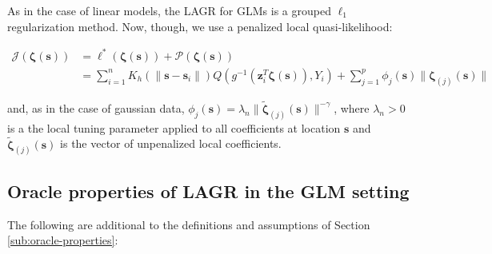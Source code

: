 \documentclass[authoryear,review, 12pt]{elsarticle}
\begin{document}
As in the case of linear models, the LAGR for GLMs is a grouped $\ell_{1}$
regularization method. Now, though, we use a penalized local quasi-likelihood:

\begin{align}
\mathcal{J}\left(\bm{\zeta}(\bm{s})\right) & =\mathcal{\ell}^{*}\left(\bm{\zeta}(\bm{s})\right)+\mathcal{P}\left(\bm{\zeta}(\bm{s})\right)\label{eq:adaptive-lasso-GLLM}\\
 & =\sum_{i=1}^{n}K_{h}\left(\|\bm{s}-\bm{s}_{i}\|\right)Q\left(g^{-1}\left(\bm{z}_{i}^{T}\bm{\zeta}(\bm{s})\right),Y_{i}\right)+\sum_{j=1}^{p}\phi_{j}\left(\bm{s}\right)\|\bm{\zeta}_{\left(j\right)}\left(\bm{s}\right)\|
\end{align}


and, as in the case of gaussian data, $\phi_{j}\left(\bm{s}\right)=\lambda_{n}\|\tilde{\bm{\zeta}}_{\left(j\right)}\left(\bm{s}\right)\|^{-\gamma}$,
where $\lambda_{n}>0$ is a the local tuning parameter applied to
all coefficients at location $\bm{s}$ and $\tilde{\bm{\zeta}}_{\left(j\right)}\left(\bm{s}\right)$
is the vector of unpenalized local coefficients.


\subsection{Oracle properties of LAGR in the GLM setting}

The following are additional to the definitions and assumptions of
Section \ref{sub:oracle-properties}:
\end{document}
